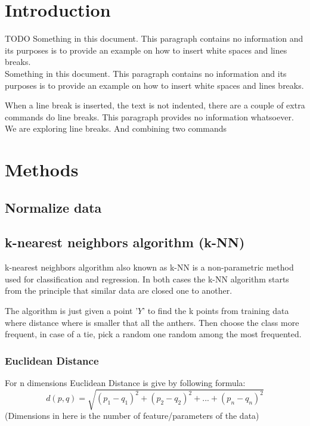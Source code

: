 \documentclass[twoside]{article}
\begin{document}
\begin{multicols}{2} %

\section{Introduction}
\indent \par
TODO
Something in this document. This paragraph contains no information 
and its purposes is to provide an example on how to insert white 
spaces and lines breaks.\\
Something in this document. This paragraph contains no information 
and its purposes is to provide an example on how to insert white 
spaces and lines breaks.\par
When a line break is inserted, the text is not indented, there 
are a couple of extra commands do line breaks. \newline
This paragraph provides no information whatsoever. We are exploring 
line breaks. \hfill \break
And combining two commands



\section{Methods}
\subsection*{Normalize data}

\subsection*{k-nearest neighbors algorithm (k-NN)}
\indent \par
k-nearest neighbors algorithm also known as k-NN is a non-parametric method used for classification and regression. In both cases the k-NN algorithm starts from the principle that similar data are
closed one to another. \par
The algorithm is just given a point '$Y$' to find the k points from training data where distance where is smaller that all the anthers. Then choose the class more frequent, in case of a tie, pick a random one random among the most frequented.

\subsubsection*{Euclidean Distance}
For n dimensions Euclidean Distance is give by following formula:
\[ d(p,q)= \sqrt{(p_1 - q_1)^2 + (p_2 - q_2)^2 + ... + (p_n - q_n)^2} \]
(Dimensions in here is the number of feature/parameters of the data)

\end{multicols}
\end{document}
